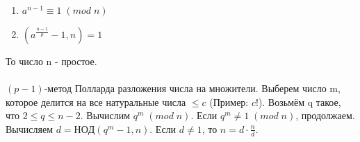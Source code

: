 \documentclass[a4paper,10pt]{article} %
\begin{document}
	\begin{enumerate}
		\item $a^{n-1} \equiv 1 \; (mod \; n)$
		\item $(a^{\frac{n-1}{p}} - 1, n) = 1$
	\end{enumerate}
	 То число n - простое. 
	 \\\\
	 $(p-1)$-метод Полларда разложения числа на множители. Выберем число m, 
	 которое делится на все натуральные числа $\leq c$ (Пример: $c!$).
	 Возьмём q такое, что $2 \leq q \leq n -2$. Вычислим $q^{m} \; (mod \; n)$.
	 Если $q^{m} \neq 1 \; (mod \; n)$, продолжаем. Вычисляем $d = НОД(q^{m} - 1, n)$. Если $d \neq 1$, то $n = d \cdot \frac{n}{d}$.
	 
	 
\end{document}
